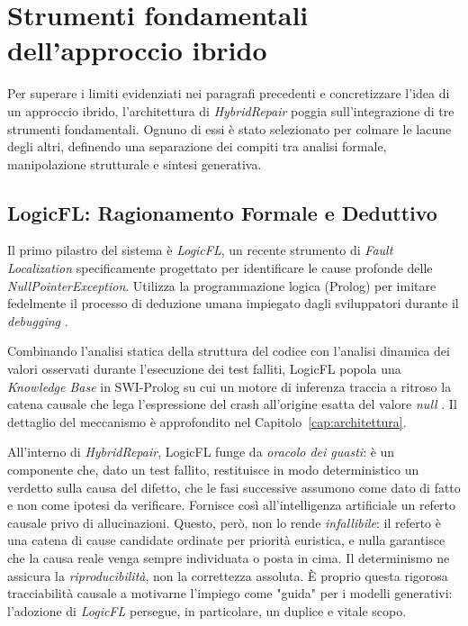 \section{Strumenti fondamentali dell'approccio ibrido}

Per superare i limiti evidenziati nei paragrafi precedenti e concretizzare l'idea di un approccio ibrido, 
l'architettura di \textit{HybridRepair} poggia sull'integrazione di tre strumenti fondamentali. 
Ognuno di essi è stato selezionato per colmare le lacune degli altri, definendo una separazione dei 
compiti tra analisi formale, manipolazione strutturale e sintesi generativa.

\subsection{LogicFL: Ragionamento Formale e Deduttivo}
Il primo pilastro del sistema è \textit{LogicFL}, un recente strumento di \textit{Fault Localization} 
specificamente progettato per identificare le cause profonde delle \textit{NullPointerException}. 
Utilizza la programmazione logica (Prolog) per imitare fedelmente il processo di deduzione 
umana impiegato dagli sviluppatori durante il \textit{debugging} \cite{kim2024identifying}. 

Combinando l'analisi statica della struttura del codice con l'analisi dinamica dei valori osservati durante
l'esecuzione dei test falliti, LogicFL popola una \textit{Knowledge Base} in SWI-Prolog su cui un motore di inferenza
traccia a ritroso la catena causale che lega l'espressione del crash all'origine esatta del valore \textit{null}
\cite{kim2024identifying}. Il dettaglio del meccanismo è approfondito nel Capitolo~\ref{cap:architettura}.

All'interno di \textit{HybridRepair}, LogicFL funge da \emph{oracolo dei guasti}: è un componente
che, dato un test fallito, restituisce in modo deterministico un verdetto sulla causa del difetto,
che le fasi successive assumono come dato di fatto e non come ipotesi da verificare. Fornisce così
all'intelligenza artificiale un referto causale privo di allucinazioni. Questo, però, non lo rende
\emph{infallibile}: il referto è una catena di cause candidate ordinate per priorità euristica, e
nulla garantisce che la causa reale venga sempre individuata o posta in cima. Il determinismo ne
assicura la \emph{riproducibilità}, non la correttezza assoluta. È proprio questa rigorosa
tracciabilità causale a motivarne l'impiego come "guida" per i modelli generativi: l'adozione di \textit{LogicFL}
persegue, in particolare, un duplice e vitale scopo.

